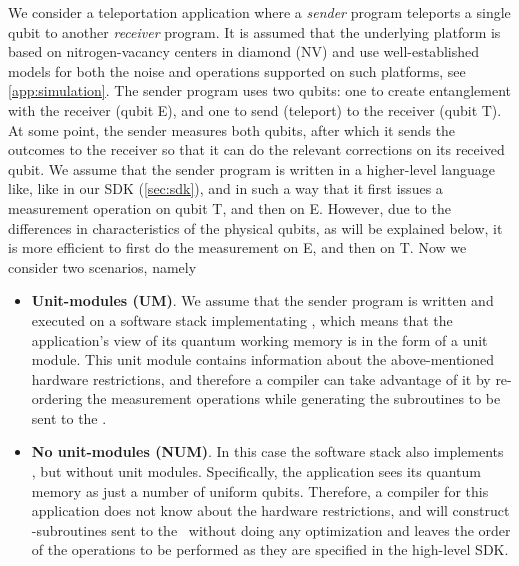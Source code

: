 We consider a teleportation application where a \textit{sender} program teleports a single qubit to another \textit{receiver} program.
It is assumed that the underlying platform is based on nitrogen-vacancy centers in diamond (NV) and use well-established models for both the noise and operations supported on such platforms, see \cref{app:simulation}.
The sender program uses two qubits: one to create entanglement with the receiver (qubit E), and one to send (teleport) to the receiver (qubit T).
At some point, the sender measures both qubits, after which it sends the outcomes to the receiver so that it can do the relevant corrections on its received qubit.
We assume that the sender program is written in a higher-level language like, like in our SDK (\cref{sec:sdk}), and in such a way that it first issues a measurement operation on qubit T, and then on E. However, due to the differences in characteristics of the physical qubits, as will be explained below, it is more efficient to first do the measurement on E, and then on T. Now we consider two scenarios, namely
\begin{itemize}
  \item \textbf{Unit-modules (UM)}.
        We assume that the sender program is written and executed on a software stack implementating \netqasm, which means that the application's view of its quantum working memory is in the form of a unit module.
        This unit module contains information about the above-mentioned hardware restrictions, and therefore a compiler can take advantage of it by re-ordering the measurement operations while generating the \netqasm subroutines to be sent to the \QNPU.
  \item \textbf{No unit-modules (NUM)}.
        In this case the software stack also implements \netqasm, but without unit modules.
        Specifically, the application sees its quantum memory as just a number of uniform qubits.
        Therefore, a compiler for this application does not know about the hardware restrictions, and will construct \netqasm-subroutines sent to the \QNPU\ without doing any optimization and leaves the order of the operations to be performed as they are specified in the high-level SDK.
\end{itemize}

